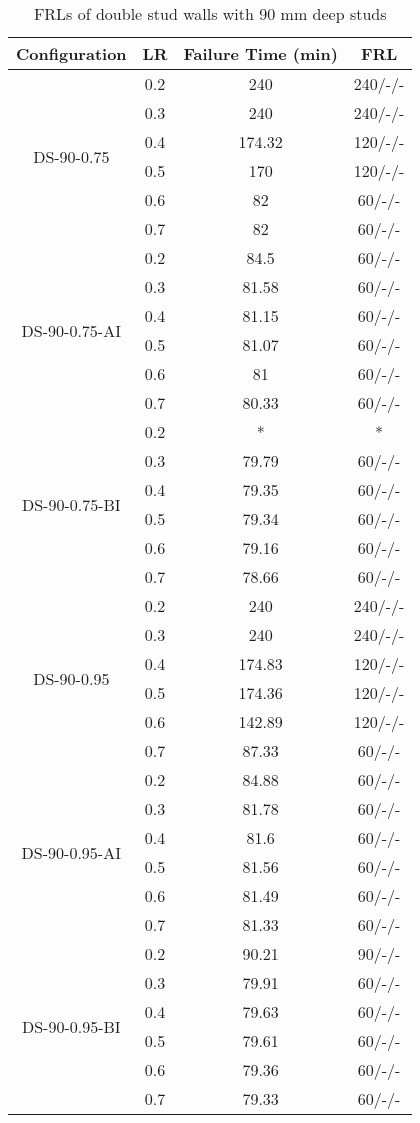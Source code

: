 \begin{table}[!htbp]
	\centering
	\caption{FRLs of double stud walls with 90 mm deep studs}
	  \begin{tabular}{cccc}
	  \toprule
	  Configuration & LR    & Failure Time (min) & FRL \\
	  \midrule
	  \multirow{6}[2]{*}{DS-90-0.75} & 0.2   & 240   & 240/-/- \\
			& 0.3   & 240   & 240/-/- \\
			& 0.4   & 174.32 & 120/-/- \\
			& 0.5   & 170   & 120/-/- \\
			& 0.6   & 82    & 60/-/- \\
			& 0.7   & 82    & 60/-/- \\
	  \midrule
	  \multirow{6}[2]{*}{DS-90-0.75-AI} & 0.2   & 84.5  & 60/-/- \\
			& 0.3   & 81.58 & 60/-/- \\
			& 0.4   & 81.15 & 60/-/- \\
			& 0.5   & 81.07 & 60/-/- \\
			& 0.6   & 81    & 60/-/- \\
			& 0.7   & 80.33 & 60/-/- \\
	  \midrule
	  \multirow{6}[2]{*}{DS-90-0.75-BI} & 0.2   & * & * \\
			& 0.3   & 79.79 & 60/-/- \\
			& 0.4   & 79.35 & 60/-/- \\
			& 0.5   & 79.34 & 60/-/- \\
			& 0.6   & 79.16 & 60/-/- \\
			& 0.7   & 78.66 & 60/-/- \\
	  \midrule
	  \multirow{6}[2]{*}{DS-90-0.95} & 0.2   & 240   & 240/-/- \\
			& 0.3   & 240   & 240/-/- \\
			& 0.4   & 174.83 & 120/-/- \\
			& 0.5   & 174.36 & 120/-/- \\
			& 0.6   & 142.89 & 120/-/- \\
			& 0.7   & 87.33 & 60/-/- \\
	  \midrule
	  \multirow{6}[2]{*}{DS-90-0.95-AI} & 0.2   & 84.88 & 60/-/- \\
			& 0.3   & 81.78 & 60/-/- \\
			& 0.4   & 81.6  & 60/-/- \\
			& 0.5   & 81.56 & 60/-/- \\
			& 0.6   & 81.49 & 60/-/- \\
			& 0.7   & 81.33 & 60/-/- \\
	  \midrule
	  \multirow{6}[2]{*}{DS-90-0.95-BI} & 0.2   & 90.21 & 90/-/- \\
			& 0.3   & 79.91 & 60/-/- \\
			& 0.4   & 79.63 & 60/-/- \\
			& 0.5   & 79.61 & 60/-/- \\
			& 0.6   & 79.36 & 60/-/- \\
			& 0.7   & 79.33 & 60/-/- \\
	  \bottomrule
	  \end{tabular}%
	\label{tab:frl-parametric-ds-90}%


\end{table}
